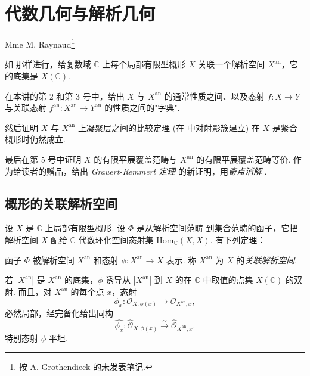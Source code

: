\chapter{代数几何与解析几何}

\noindent Mme M. Raynaud\footnote{按 A. Grothendieck 的未发表笔记.}

如 \cite{exp12-10} 那样进行，给复数域 $\mathbb{C}$ 上每个局部有限型概形 $X$ 关联一个解析空间 $X^{\mathrm{an}}$，它的底集是 $X(\mathbb{C})$.

在本讲的第 2 和第 3 号中，给出 $X$ 与 $X^{\mathrm{an}}$ 的通常性质之间、以及态射 $f \colon X \to Y$ 与关联态射 $f^{\mathrm{an}} \colon X^{\mathrm{an}} \to Y^{\mathrm{an}}$ 的性质之间的"字典".

然后证明 $X$ 与 $X^{\mathrm{an}}$ 上凝聚层之间的比较定理 (在 \cite[第 12 号]{exp12-10} 中对射影簇建立) 在 $X$ 是紧合概形时仍然成立.

最后在第 5 号中证明 $X$ 的有限平展覆盖范畴与 $X^{\mathrm{an}}$ 的有限平展覆盖范畴等价. 作为给读者的赠品，给出 \emph{Grauert-Remmert 定理} \cite{exp12-6} 的新证明，用\emph{奇点消解} \cite{exp12-8}.

\section{概形的关联解析空间}

设 $X$ 是 $\mathbb{C}$ 上局部有限型概形. 设 $\Phi$ 是从解析空间范畴 \cite[第 9 号]{exp12-4} 到集合范畴的函子，它把解析空间 $X$ 配给 $\mathbb{C}$-代数环化空间态射集 $\mathrm{Hom}_{\mathbb{C}}(X, X)$. 有下列定理：

\begin{theorem}[定理与定义]\label{thm:XII.1.1}
函子 $\Phi$ 被解析空间 $X^{\mathrm{an}}$ 和态射 $\phi \colon X^{\mathrm{an}} \to X$ 表示. 称 $X^{\mathrm{an}}$ 为 $X$ 的\emph{关联解析空间}.
\end{theorem}

若 $|X^{\mathrm{an}}|$ 是 $X^{\mathrm{an}}$ 的底集，$\phi$ 诱导从 $|X^{\mathrm{an}}|$ 到 $X$ 的在 $\mathbb{C}$ 中取值的点集 $X(\mathbb{C})$ 的双射. 而且，对 $X^{\mathrm{an}}$ 的每个点 $x$，态射
\[
\phi_x \colon \mathcal{O}_{X,\phi(x)} \longrightarrow \mathcal{O}_{X^{\mathrm{an}},x},
\]
必然局部，经完备化给出同构
\[
\widehat{\phi_x} \colon \widehat{\mathcal{O}}_{X,\phi(x)} \xrightarrow{\sim} \widehat{\mathcal{O}}_{X^{\mathrm{an}},x}.
\]
特别态射 $\phi$ 平坦.

